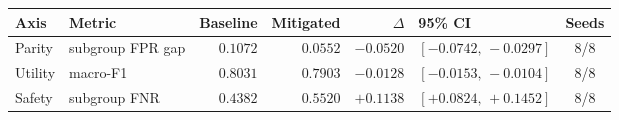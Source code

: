 \begin{tabular}{llrrrlc}
\toprule
Axis & Metric & Baseline & Mitigated & $\Delta$ & 95\% CI & Seeds \\
\midrule
Parity & subgroup FPR gap & $0.1072$ & $0.0552$ & $-0.0520$ & $[-0.0742,\,-0.0297]$ & 8/8 \\
Utility & macro-F1 & $0.8031$ & $0.7903$ & $-0.0128$ & $[-0.0153,\,-0.0104]$ & 8/8 \\
Safety & subgroup FNR & $0.4382$ & $0.5520$ & $+0.1138$ & $[+0.0824,\,+0.1452]$ & 8/8 \\
\bottomrule
\end{tabular}

